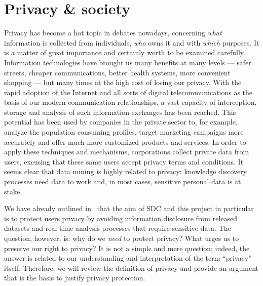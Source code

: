 \section{Privacy \& society}
\label{Practical::Privacy}

Privacy has become a hot topic in debates nowadays, concerning \textit{what} information is collected from individuals, \textit{who} owns it and with \textit{which} purposes. It is a matter of great importance and certainly worth to be examined carefully. Information technologies have brought us many benefits at many levels --- safer streets, cheaper communications, better health systems, more convenient shopping --- but many times at the high cost of losing our privacy. With the rapid adoption of the Internet and all sorts of digital telecommunications as the basis of our modern communication relationships, a vast capacity of interception, storage and analysis of such information exchanges has been reached. This potential has been used by companies in the private sector to, for example, analyze the population consuming profiles, target marketing campaigns more accurately and offer much more customized products and services. In order to apply these techniques and mechanisms, corporations collect private data from users, excusing that these same users accept privacy terms and conditions. It seems clear that data mining is highly related to privacy: knowledge discovery processes need data to work and, in most cases, sensitive personal data is at stake.

We have already outlined in~ that the aim of SDC and this project in particular is to protect users privacy by avoiding information disclosure from released datasets and real time analysis processes that require sensitive data. The question, however, is: why do we \textit{need} to protect privacy? What urges us to preserve our right to privacy? It is not a simple and mere question; indeed, the answer is related to our understanding and interpretation of the term ``privacy'' itself. Therefore, we will review the definition of privacy and provide an argument that is the basis to justify privacy protection.

